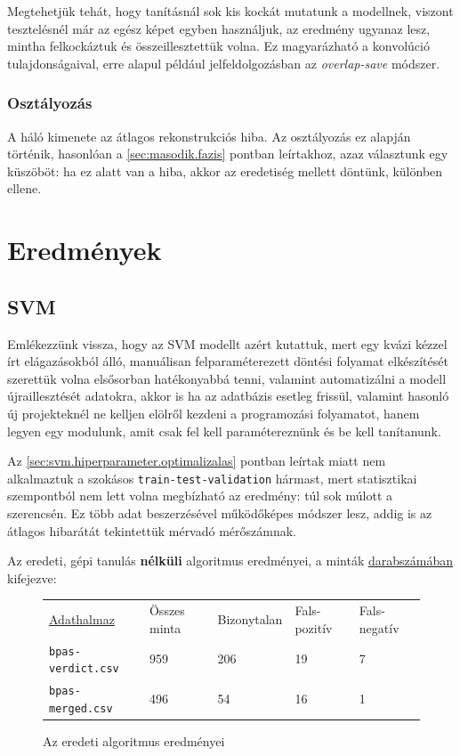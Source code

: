 Megtehetjük tehát, hogy tanításnál sok kis kockát mutatunk a modellnek, viszont tesztelésnél
már az egész képet egyben használjuk, az eredmény ugyanaz lesz, mintha felkockáztuk 
és összeillesztettük volna. Ez magyarázható a konvolúció 
tulajdonságaival, erre alapul például jelfeldolgozásban az \textit{overlap-save} módszer.



\subsubsection{Osztályozás}

A háló kimenete az átlagos rekonstrukciós hiba. Az osztályozás ez alapján történik,
hasonlóan a \ref{sec:masodik.fazis} pontban leírtakhoz, azaz választunk egy küszöböt:
ha ez alatt van a hiba, akkor az eredetiség mellett döntünk, különben ellene.



\newpage
\section{Eredmények}

\subsection{SVM}
\label{sec:svm.eredmenyek}

Emlékezzünk vissza, hogy az SVM modellt azért kutattuk, mert egy kvázi kézzel írt elágazásokból 
álló, manuálisan felparaméterezett döntési folyamat elkészítését szerettük volna elsősorban
hatékonyabbá tenni, valamint automatizálni a modell újraillesztését adatokra, akkor is ha az 
adatbázis esetleg frissül, valamint hasonló új projekteknél ne kelljen elölről kezdeni a programozási
folyamatot, hanem legyen egy modulunk, amit csak fel kell paramétereznünk és be kell tanítanunk.


Az \ref{sec:svm.hiperparameter.optimalizalas} pontban leírtak miatt nem alkalmaztuk a szokásos 
\texttt{train-test-validation} hármast, mert statisztikai szempontból nem lett volna megbízható
az eredmény: túl sok múlott a szerencsén. Ez több adat beszerzésével működőképes módszer lesz,
addig is az átlagos hibarátát tekintettük mérvadó mérőszámnak.



\noindent
Az eredeti, gépi tanulás \textbf{nélküli} algoritmus eredményei, a minták \underline{darabszámában} 
kifejezve:

\begin{figure}[h!]
	\centering
	\begin{tabular}{ l l l l l }
		\underline{Adathalmaz}		& Összes minta 	& Bizonytalan	& Fals-pozitív	& Fals-negatív \\
		\texttt{bpas-verdict.csv}\footnotemark 	& 959 			& 206 			& 19	 	& 7			\\
		\texttt{bpas-merged.csv}\footnotemark[\value{footnote}] 	& 496			& 54 			& 16		& 1			\\
	\end{tabular}

	\caption{Az eredeti algoritmus eredményei}
\end{figure}

